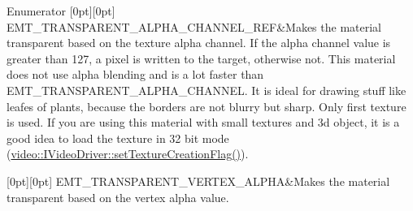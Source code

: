 \begin{DoxyEnumFields}{Enumerator}
[0pt][0pt]{}\mbox{\label{namespaceirr_1_1video_ac8e9b6c66f7cebabd1a6d30cbc5430f1a2cbc6ccd7b5a5438e69327663e57555f}} 
E\+M\+T\+\_\+\+T\+R\+A\+N\+S\+P\+A\+R\+E\+N\+T\+\_\+\+A\+L\+P\+H\+A\+\_\+\+C\+H\+A\+N\+N\+E\+L\+\_\+\+R\+EF&Makes the material transparent based on the texture alpha channel. If the alpha channel value is greater than 127, a pixel is written to the target, otherwise not. This material does not use alpha blending and is a lot faster than E\+M\+T\+\_\+\+T\+R\+A\+N\+S\+P\+A\+R\+E\+N\+T\+\_\+\+A\+L\+P\+H\+A\+\_\+\+C\+H\+A\+N\+N\+EL. It is ideal for drawing stuff like leafes of plants, because the borders are not blurry but sharp. Only first texture is used. If you are using this material with small textures and 3d object, it is a good idea to load the texture in 32 bit mode (\hyperlink{classirr_1_1video_1_1IVideoDriver_a868b58a6b86b9e4841ca3879ce246c4e}{video\+::\+I\+Video\+Driver\+::set\+Texture\+Creation\+Flag()}). \\
\hline

[0pt][0pt]{}\mbox{\label{namespaceirr_1_1video_ac8e9b6c66f7cebabd1a6d30cbc5430f1aa5139511eb2dbc1d2ae3dd91fc13f842}} 
E\+M\+T\+\_\+\+T\+R\+A\+N\+S\+P\+A\+R\+E\+N\+T\+\_\+\+V\+E\+R\+T\+E\+X\+\_\+\+A\+L\+P\+HA&Makes the material transparent based on the vertex alpha value. \\
\hline


\end{DoxyEnumFields}

